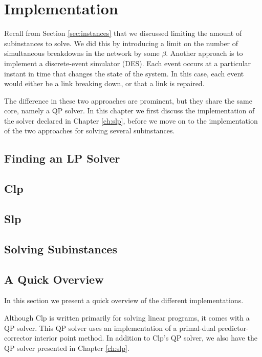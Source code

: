 \chapter{Implementation}
Recall from Section \ref{sec:instances} that we discussed limiting the amount
of subinstances to solve. We did this by introducing a limit on the number of
simultaneous breakdowns in the network by some $\beta$.
Another approach is to implement a discrete-event simulator (DES). Each event
occurs at a particular instant in time that changes the state of the system.
In this case, each event would either be a link breaking down, or that a link
is repaired.

The difference in these two approaches are prominent, but they share the same
core, namely a QP solver. In this chapter we first discuss the implementation
of the solver declared in Chapter \ref{ch:slp}, before we move on to the
implementation of the two approaches for solving several subinstances.
\label{ch:implementation}

\section{Finding an LP Solver}


\section{Clp}


\section{Slp}


\section{Solving Subinstances}


\section{A Quick Overview}
In this section we present a quick overview of the different
implementations.

Although Clp is written primarily for solving linear
programs, it comes with a QP solver. This QP solver uses an implementation
of a primal-dual predictor-corrector interior point method. In addition
to Clp's QP solver, we also have the QP solver presented in Chapter
\ref{ch:slp}.

